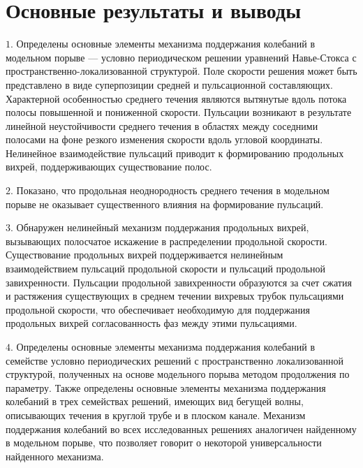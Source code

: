 
\section*{\centering Основные результаты и выводы}

\noindent $1.$ Определены основные элементы механизма поддержания колебаний в модельном порыве --- условно периодическом решении уравнений Навье-Стокса с пространственно-локализованной структурой. Поле скорости решения может быть представлено в виде суперпозиции средней и пульсационной составляющих. Характерной особенностью среднего течения являются вытянутые вдоль потока полосы повышенной и пониженной скорости. Пульсации возникают в результате линейной неустойчивости среднего течения в областях между соседними полосами на фоне резкого изменения скорости вдоль угловой координаты. Нелинейное взаимодействие пульсаций приводит к формированию продольных вихрей, поддерживающих существование полос.

\noindent $2.$ Показано, что продольная неоднородность среднего течения в модельном порыве не оказывает существенного влияния на формирование пульсаций. 

\noindent $3.$ Обнаружен нелинейный механизм поддержания продольных вихрей, вызывающих полосчатое искажение в распределении продольной скорости. Существование продольных вихрей поддерживается нелинейным взаимодействием пульсаций продольной скорости и пульсаций продольной завихренности. Пульсации продольной завихренности образуются за счет сжатия и растяжения существующих в среднем течении вихревых трубок пульсациями продольной скорости, что обеспечивает необходимую для поддержания продольных вихрей согласованность фаз между этими пульсациями. 

\noindent $4.$ Определены основные элементы механизма поддержания колебаний в семействе условно периодических решений с пространственно локализованной структурой, полученных на основе модельного порыва методом продолжения по параметру. Также определены основные элементы механизма поддержания колебаний в трех семействах решений, имеющих вид бегущей волны, описывающих течения в круглой трубе и в плоском канале. Механизм поддержания колебаний во всех исследованных решениях аналогичен найденному в модельном порыве, что позволяет говорит о некоторой универсальности найденного механизма. 
